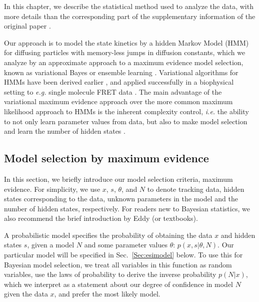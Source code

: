 In this chapter, we describe the statistical method used to analyze
the data, with more details than the corresponding part of the
supplementary information of the original paper \cite{Persson2012}.


Our approach is to model the state kinetics by a hidden Markov Model
(HMM) for diffusing particles with memory-less jumps in diffusion
constants, which we analyze by an approximate approach to a maximum
evidence model selection, known as variational Bayes or ensemble
learning \cite{Mackay2003,Bishop2006}. Variational algorithms for HMMs
have been derived
earlier \cite{Mackay1997,Ghahramani2002,Beal2003,Bronson2009,Bronson2010},
and applied successfully in a biophysical setting to \textit{e.g.}
single molecule FRET data \cite{Bronson2009,Bronson2010}. The main
advantage of the variational maximum evidence approach over the more
common maximum likelihood approach to HMMs is the inherent complexity
control, \textit{i.e.} the ability to not only learn parameter values
from data, but also to make model selection and learn the number of
hidden states \cite{Bronson2010}.


\subsection{Model selection by maximum evidence}
In this section, we briefly introduce our model selection criteria,
maximum evidence.  For simplicity, we use $x$, $s$, $\theta$, and $N$
to denote tracking data, hidden states corresponding to the data,
unknown parameters in the model and the number of hidden states,
respectively. For readers new to Bayesian statistics, we also
recommend the brief introduction by Eddy \cite{Eddy2004} (or
textbooks\cite{Mackay2003,Bishop2006}).

A probabilistic model specifies the probability of obtaining the data
$x$ and hidden states $s$, given a model $N$ and some parameter values
$\theta$: $p(x,s|\theta,N)$. Our particular model will be specified in
Sec.~\ref{Sec:esimodel} below.  To use this for Bayesian model
selection, we treat all variables in this function as random
variables, use the laws of probability to derive the inverse
probability $p(N|x)$, which we interpret as a statement about our
degree of confidence in model $N$ given the data $x$, and prefer the
most likely model.

